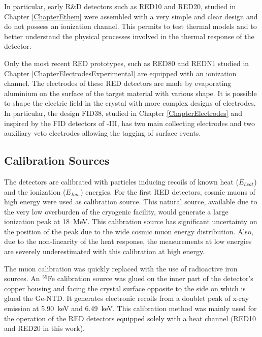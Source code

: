 In particular, early R\&D detectors such as RED10 and RED20, studied in Chapter \ref{ChapterEthem} were assembled with a very simple and clear design and do not possess an ionization channel. This permits to test thermal models and to better understand the physical processes involved in the thermal response of the detector.

Only the most recent RED prototypes, such as RED80 and REDN1 studied in Chapter \ref{ChapterElectrodesExperimental} are equipped with an ionization channel.
The electrodes of these RED detectors are made by evaporating aluminium on the surface of the target material with various shape. It is possible to shape the electric field in the crystal with more complex designs of electrodes. In particular, the design FID38, studied in Chapter \ref{ChapterElectrodes} and inspired by the FID detectors of \Edelweiss{}-III, has two main collecting electrodes and two auxiliary veto electrodes allowing the tagging of surface events.





\subsection{Calibration Sources}
\label{par:calibration-source}
The detectors are calibrated with particles inducing recoils of known heat ($E_{heat}$) and the ionization ($E_{Ion.}$) energies.
For the first RED detectors, cosmic muons of high energy were used as calibration source. This natural source, available due to the very low overburden of the cryogenic facility, would generate a large ionization peak at \SI{18}{\mega\eV}. This calibration source has significant uncertainty on the position of the peak due to the wide cosmic muon energy distribution. Also, due to the non-linearity of the heat response, the measurements at low energies are severely underestimated with this calibration at high energy.

The muon calibration was quickly replaced with the use of radioactive iron sources.
An $^{55}$Fe calibration source was glued on the inner part of the detector's copper housing and facing the crystal surface opposite to the side on which is glued the Ge-NTD. It generates electronic recoils from a doublet peak of x-ray emission at \SI{5.90}{\kilo\eV} and \SI{6.49}{\kilo\eV}. This calibration method was mainly used for the operation of the RED detectors equipped solely with a heat channel (RED10 and RED20 in this work).

